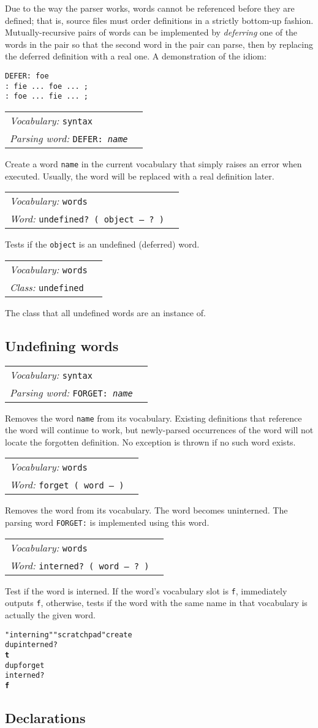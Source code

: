 \documentclass{book}
\newcommand{\vocabulary}[1]{\emph{Vocabulary:} \texttt{#1}&\\}
\newcommand{\parsingword}[2]{\index{\texttt{#1}}\emph{Parsing word:} \texttt{#2}&\\}
\newcommand{\ordinaryword}[2]{\index{\texttt{#1}}\emph{Word:} \texttt{#2}&\\}
\newcommand{\classword}[1]{\index{\texttt{#1}}\emph{Class:} \texttt{#1}&\\}
\newcommand{\wordtable}[1]{


\begin{tabularx}{12cm}{lX}
\hline
#1
\hline
\end{tabularx}

}
\begin{document}
Due to the way the parser works, words cannot be referenced before they are defined; that is, source files must order definitions in a strictly bottom-up fashion. Mutually-recursive pairs of words can be implemented by \emph{deferring} one of the words in the pair so that the second word in the pair can parse, then by replacing the deferred definition with a real one.
A demonstration of the idiom:
\begin{verbatim}
DEFER: foe
: fie ... foe ... ;
: foe ... fie ... ;
\end{verbatim}
\wordtable{
\vocabulary{syntax}
\parsingword{DEFER:}{DEFER:~\emph{name}}
}
Create a word \texttt{name} in the current vocabulary that simply raises an error when executed. Usually, the word will be replaced with a real definition later.
\wordtable{
\vocabulary{words}
\ordinaryword{undefined?}{undefined?~( object -- ?~)}

}
Tests if the \texttt{object} is an undefined (deferred) word.
\wordtable{
\vocabulary{words}
\classword{undefined}
}
The class that all undefined words are an instance of.

\subsection{Undefining words}

\wordtable{
\vocabulary{syntax}
\parsingword{FORGET:}{FORGET:~\emph{name}}
}
Removes the word \texttt{name} from its vocabulary. Existing definitions that reference the word will continue to work, but newly-parsed occurrences of the word will not locate the forgotten definition. No exception is thrown if no such word exists.
\uninternedglos
\wordtable{
\vocabulary{words}
\ordinaryword{forget}{forget ( word -- )}
}
Removes the word from its vocabulary. The word becomes uninterned. The parsing word \texttt{FORGET:} is implemented using this word.
\wordtable{
\vocabulary{words}
\ordinaryword{interned?}{interned?~( word -- ?~)}
}
Test if the word is interned. If the word's vocabulary slot is \verb|f|, immediately outputs \verb|f|, otherwise, tests if the word with the same name in that vocabulary is actually the given word.
\begin{alltt}
  "interning" "scratchpad" create
  dup interned?
\textbf{t}
  dup forget
  interned?
\textbf{f}
\end{alltt}

\subsection{Declarations}\label{declarations}
\end{document}
